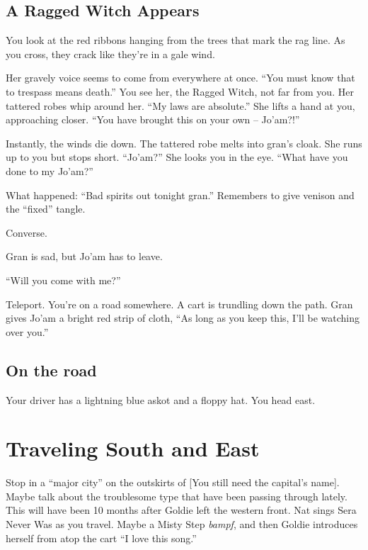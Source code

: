 \begin{multicols}{2}
  \subsection{A Ragged Witch Appears}\label{subsec:scene:ARaggedWitchAppears}

  \begin{aloud}
  You look at the red ribbons hanging from the trees that mark the rag line.
  As you cross, they crack like they're in a gale wind.

  Her gravely voice seems to come from everywhere at once.
  ``You must know that to trespass means death.''
  You see her, the Ragged Witch, not far from you.
  Her tattered robes whip around her.
  ``My laws are absolute.''
  She lifts a hand at you, approaching closer.
  ``You have brought this on your own --
    Jo'am?!''

  Instantly, the winds die down.
  The tattered robe melts into gran's cloak.
  She runs up to you but stops short.
  ``Jo'am?''
  She looks you in the eye.
  ``What have you done to my Jo'am?''
  \end{aloud}

  \begin{aloud}
    What happened:
    ``Bad spirits out tonight gran.''
    Remembers to give venison and the ``fixed'' tangle.
  \end{aloud}


  Converse.

Gran is sad, but Jo'am has to leave.

``Will you come with me?''

Teleport.
You're on a road somewhere.
A cart is trundling down the path.
Gran gives Jo'am a bright red strip of cloth,
``As long as you keep this, I'll be watching over you.''

\subsection{On the road}\label{subsec:scene:OnTheRoad}
  Your driver has a lightning blue askot and a floppy hat.
  You head east.
\end{multicols}


\section{Traveling South and East}

Stop in a ``major city'' on the outskirts of [You still need the capital's name].
Maybe talk about the troublesome type that have been passing through lately.
This will have been 10 months after Goldie left the western front.
Nat sings Sera Never Was as you travel.
Maybe a Misty Step \emph{bampf}, and then Goldie introduces herself from atop the cart
  ``I love this song.''

